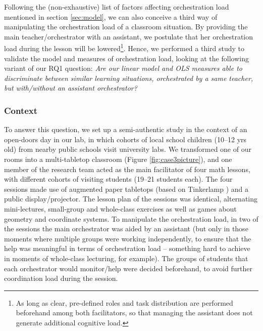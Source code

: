 \documentclass[10pt,journal,compsoc]{IEEEtran}
\begin{document}
Following the (non-exhaustive) list of factors affecting orchestration load mentioned in section \ref{sec:model}, we can also conceive a third way of manipulating the orchestration load of a classroom situation. By providing the main teacher/orchestrator with an assistant, we postulate that her orchestration load during the lesson will be lowered\footnote{As long as clear, pre-defined roles and task distribution are performed beforehand among both facilitators, so that managing the assistant does not generate additional cognitive load.}. Hence, we performed a third study to validate the model and measures of orchestration load, looking at the following variant of our RQ1 question: \textit{Are our linear model and OLS measures able to discriminate between similar learning situations, orchestrated by a same teacher, but with/without an assistant orchestrator?}


\subsubsection{Context}

To answer this question, we set up a semi-authentic study in the context of an open-doors day in our lab, in which cohorts of local school children (10--12 yrs old) from nearby public schools visit university labs. We transformed one of our rooms into a multi-tabletop classroom (Figure \ref{fig:case3picture}), and one member of the research team acted as the main facilitator of four math lessons, with different cohorts of visiting students (19--21 students each). The four sessions made use of augmented paper tabletops (based on Tinkerlamp \cite{do2012tinkerlamp}) and a public display/projector. The lesson plan of the sessions was identical, alternating mini-lectures, small-group and whole-class exercises as well as games about geometry and coordinate systems. To manipulate the orchestration load, in two of the sessions the main orchestrator was aided by an assistant (but only in those moments where multiple groups were working independently, to ensure that the help was meaningful in terms of orchestration load -- something hard to achieve in moments of whole-class lecturing, for example). The groups of students that each orchestrator would monitor/help were decided beforehand, to avoid further coordination load during the session.
\end{document}
